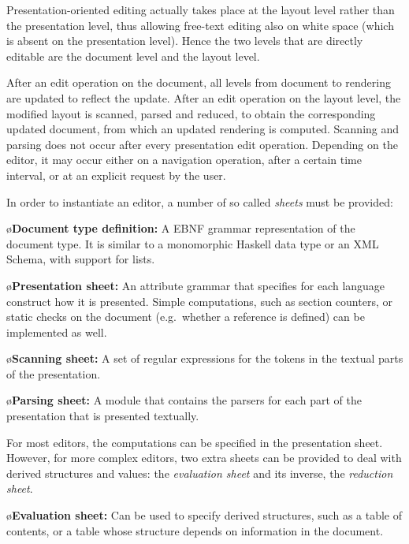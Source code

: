 \documentclass[10pt]{article}
\begin{document}
\ec




\bc
Presentation-oriented editing actually takes place at the layout level rather than the presentation level, thus allowing free-text editing also on white space (which is absent on the presentation level). Hence the two levels that are directly editable are the document level and the layout level. 
\ec

After an edit operation on the document, all levels from document to rendering are updated to reflect the update. After an edit operation on the layout level, the modified layout is scanned, parsed and reduced, to obtain the corresponding updated document, from which an updated rendering is computed. Scanning and parsing does not occur after every presentation edit operation. Depending on the editor, it may occur either on a navigation operation, after a certain time interval, or at an explicit request by the user.

In order to instantiate an editor, a number of so called {\em sheets} must be provided:

\bl
\o{\bf Document type definition:} 
A EBNF grammar representation of the document type. It is similar to a monomorphic Haskell data type or an XML Schema, with support for lists.

\o{\bf Presentation sheet:} 
An attribute grammar that specifies for each language construct how it is presented. Simple computations, such as section counters, or static checks on the document (e.g.\ whether a reference is defined) can be implemented as well.

\o{\bf Scanning sheet:}
A set of regular expressions for the tokens in the textual parts of the presentation.

\o{\bf Parsing sheet:} 
A module that contains the parsers for each part of the presentation that is presented textually.
\el

For most editors, the computations can be specified in the presentation sheet. However, for more complex editors, two extra sheets can be provided to deal with derived structures and values: the {\em evaluation sheet} and its inverse, the {\em reduction sheet}.  

\bl
\o{\bf Evaluation sheet:}
Can be used to specify derived structures, such as a table of contents, or a table whose structure depends on information in the document. 
\end{document}
